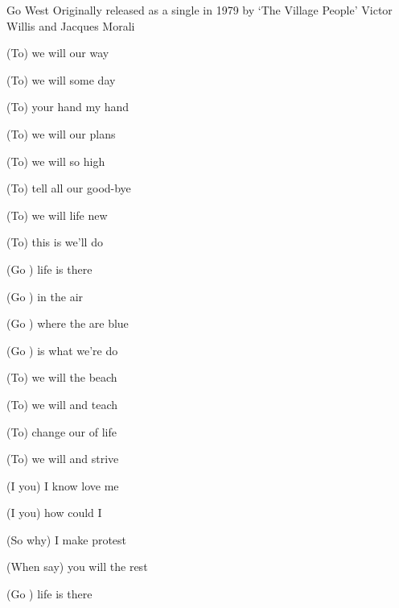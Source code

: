 \begin{SBSong}{Go West}
  {Originally released as a single in 1979 by `The Village People'}
  {Victor Willis and Jacques Morali}
  \begin{SBVerse}
    (To) we will  our way

    (To) we will  some day

    (To) your hand  my hand

    (To) we will  our plans

    (To) we will  so high

    (To) tell all our  good-bye

    (To) we will  life new

    (To) this is  we'll do
  \end{SBVerse}
  
  \begin{SBChorus}
    (Go ) life is  there

    (Go ) in the  air

    (Go ) where the  are blue

    (Go ) is what we're  do
  \end{SBChorus}
  \begin{SBVerse}
    (To) we will  the beach

    (To) we will  and teach

    (To) change our  of life

    (To) we will  and strive

    (I  you) I know  love me

    (I  you) how could I 

    (So  why) I make  protest

    (When  say) you will  the rest
  \end{SBVerse}
  \begin{SBChorus}
    (Go ) life is  there


\end{SBChorus}
\end{SBSong}
